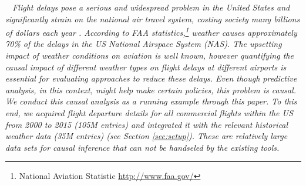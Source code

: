 \begin{example} \em \delay \ \em
Flight delays pose a serious and widespread problem in the United States and
 significantly strain on the national air travel system, costing society many billions of dollars each year \cite{ball2010total}.
According to FAA statistics,\footnote{National Aviation Statistic \url{http://www.faa.gov/}}
  weather causes approximately 70\% of the delays in the US National Airspace System (NAS).
The upsetting impact of weather conditions on aviation is well known, however quantifying
  the causal impact of different weather types on flight delays at different airports is essential for evaluating
  approaches to reduce these delays.
Even though predictive analysis, in this context, might help make certain policies, this problem is causal.
We conduct this causal analysis as a running example through this paper.
To this end, we acquired flight departure details for all commercial flights within the US from 2000 to 2015
  (105M entries) and integrated it with the relevant historical weather data (35M entries) (see Section \ref{sec:setup}).
These are relatively large data sets for causal inference that can not be handseled by the existing tools.
\end{example}


